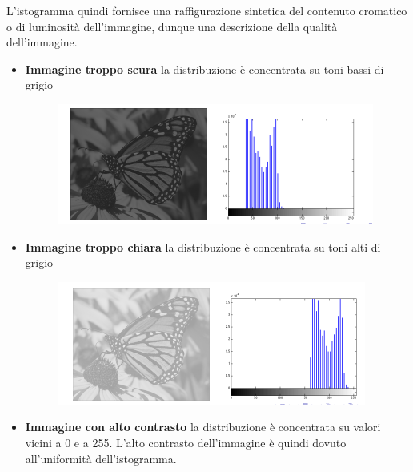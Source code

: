 L'istogramma quindi fornisce una raffigurazione sintetica del contenuto cromatico o di luminosità dell'immagine, dunque una descrizione
della qualità dell'immagine.

\begin{itemize}
    \item \textbf{Immagine troppo scura}
          la distribuzione è concentrata su toni bassi di grigio

          \begin{figure}[H]
              \centering
              \includegraphics[width=\linewidth, keepaspectratio]{capitoli/immagini/imgs/isto-scuro.png}
          \end{figure}

    \item \textbf{Immagine troppo chiara}
          la distribuzione è concentrata su toni alti di grigio

          \begin{figure}[H]
              \centering
              \includegraphics[width=\linewidth, keepaspectratio]{capitoli/immagini/imgs/isto-chiaro.png}
          \end{figure}

    \item \textbf{Immagine con alto contrasto}
          la distribuzione è concentrata su valori vicini a 0 e a 255. L'alto contrasto dell'immagine è quindi dovuto all'uniformità dell'istogramma.


\end{itemize}
